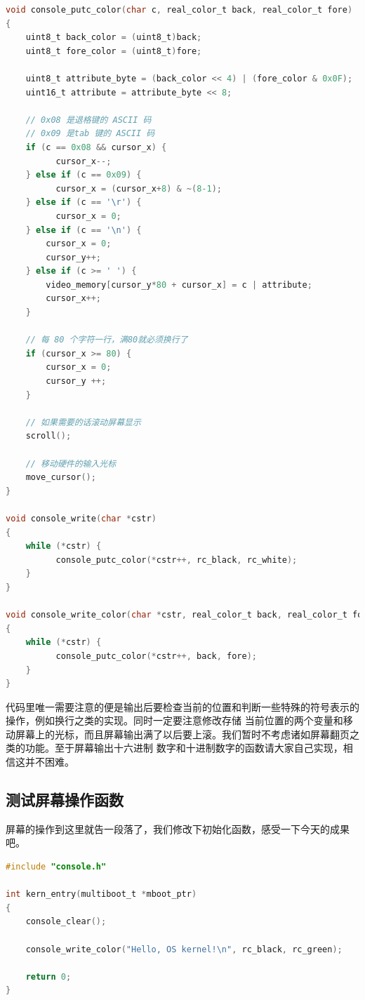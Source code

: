 \begin{lstlisting}[language = C, caption = drivers/console.c]
void console_putc_color(char c, real_color_t back, real_color_t fore)
{
	uint8_t back_color = (uint8_t)back;
	uint8_t fore_color = (uint8_t)fore;

	uint8_t attribute_byte = (back_color << 4) | (fore_color & 0x0F);
	uint16_t attribute = attribute_byte << 8;

	// 0x08 是退格键的 ASCII 码
	// 0x09 是tab 键的 ASCII 码
	if (c == 0x08 && cursor_x) {
	      cursor_x--;
	} else if (c == 0x09) {
	      cursor_x = (cursor_x+8) & ~(8-1);
	} else if (c == '\r') {
	      cursor_x = 0;
	} else if (c == '\n') {
		cursor_x = 0;
		cursor_y++;
	} else if (c >= ' ') {
		video_memory[cursor_y*80 + cursor_x] = c | attribute;
		cursor_x++;
	}

	// 每 80 个字符一行，满80就必须换行了
	if (cursor_x >= 80) {
		cursor_x = 0;
		cursor_y ++;
	}

	// 如果需要的话滚动屏幕显示
	scroll();

	// 移动硬件的输入光标
	move_cursor();
}

void console_write(char *cstr)
{
	while (*cstr) {
	      console_putc_color(*cstr++, rc_black, rc_white);
	}
}

void console_write_color(char *cstr, real_color_t back, real_color_t fore)
{
	while (*cstr) {
	      console_putc_color(*cstr++, back, fore);
	}
}
\end{lstlisting}

\par 代码里唯一需要注意的便是输出后要检查当前的位置和判断一些特殊的符号表示的操作，例如换行之类的实现。同时一定要注意修改存储\allowbreak
当前位置的两个变量和移动屏幕上的光标，而且屏幕输出满了以后要上滚。我们暂时不考虑诸如屏幕翻页之类的功能。至于屏幕输出十六进制\allowbreak
数字和十进制数字的函数请大家自己实现，相信这并不困难。

\subsection{测试屏幕操作函数}

\par 屏幕的操作到这里就告一段落了，我们修改下初始化函数，感受一下今天的成果吧。

\begin{lstlisting}[language = C, caption = init/entry.c]
#include "console.h"

int kern_entry(multiboot_t *mboot_ptr)
{
	console_clear();

	console_write_color("Hello, OS kernel!\n", rc_black, rc_green);

	return 0;
}
\end{lstlisting}

